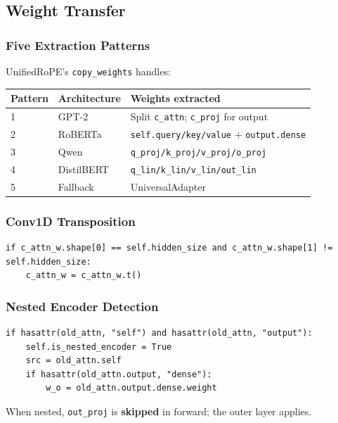 {\subsection{Weight Transfer}

\subsubsection{Five Extraction Patterns}

UnifiedRoPE's \texttt{copy\_weights} handles:

\begin{table}[H]
\centering
\small
\begin{tabular}{lll}
\toprule
\textbf{Pattern} & \textbf{Architecture} & \textbf{Weights extracted} \\
\midrule
1 & GPT-2 & Split \texttt{c\_attn}; \texttt{c\_proj} for output \\
2 & RoBERTa & \texttt{self.query/key/value} + \texttt{output.dense} \\
3 & Qwen & \texttt{q\_proj/k\_proj/v\_proj/o\_proj} \\
4 & DistilBERT & \texttt{q\_lin/k\_lin/v\_lin/out\_lin} \\
5 & Fallback & UniversalAdapter \\
\bottomrule
\end{tabular}
\end{table}

\subsubsection{Conv1D Transposition}

\begin{lstlisting}
if c_attn_w.shape[0] == self.hidden_size and c_attn_w.shape[1] != self.hidden_size:
    c_attn_w = c_attn_w.t()
\end{lstlisting}

\subsubsection{Nested Encoder Detection}

\begin{lstlisting}
if hasattr(old_attn, "self") and hasattr(old_attn, "output"):
    self.is_nested_encoder = True
    src = old_attn.self
    if hasattr(old_attn.output, "dense"):
        w_o = old_attn.output.dense.weight
\end{lstlisting}

When nested, \texttt{out\_proj} is \textbf{skipped} in forward; the outer layer applies.

}
